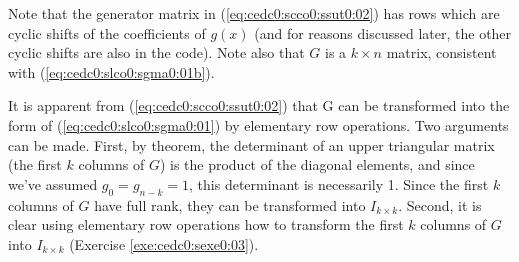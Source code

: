 \noindent{}Note that the generator matrix in (\ref{eq:cedc0:scco0:ssut0:02})
has rows which are cyclic shifts of the coefficients of $g(x)$ (and 
for reasons discussed later, the other cyclic
shifts are also in the code).  Note also that $G$ is a
$k \times n$ matrix, consistent with (\ref{eq:cedc0:slco0:sgma0:01b}).

It is apparent from (\ref{eq:cedc0:scco0:ssut0:02}) that G can be
transformed into the form of (\ref{eq:cedc0:slco0:sgma0:01}) by
elementary row operations.  Two arguments can be
made.  First, by theorem, the determinant of an upper triangular matrix
(the first $k$ columns of $G$) is the product of the diagonal elements, 
and since we've assumed $g_0 = g_{n-k} = 1$, this determinant is necessarily 1.
Since the first $k$ columns of $G$ have full rank, they can be transformed
into $I_{k \times k}$.  Second, it is clear using elementary row operations how
to transform the first $k$ columns of $G$ into 
$I_{k \times k}$ (Exercise \ref{exe:cedc0:sexe0:03}).

